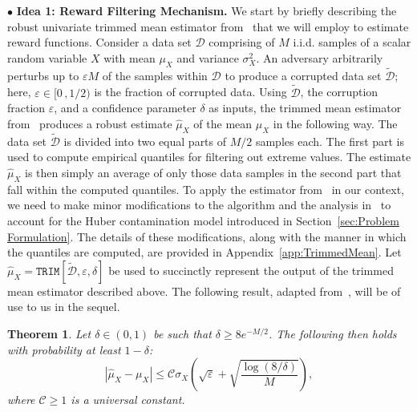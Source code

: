 \documentclass{article}
\newcommand{\mc}{\mathcal}
\newtheorem{theorem}{Theorem}
\begin{document}
$\bullet$ \textbf{Idea 1: Reward Filtering Mechanism.} We start by briefly describing the robust univariate trimmed mean estimator from~\citet{lugosi} that we will employ to estimate reward functions. Consider a data set $\mc{D}$ comprising of $M$ i.i.d. samples of a scalar random variable $X$ with mean $\mu_X$ and variance $\sigma^2_X$. An adversary arbitrarily perturbs up to $\varepsilon M$ of the samples within $\mc{D}$ to produce a corrupted data set $\tilde{\mc{D}}$; here, $\varepsilon \in [0 \, ,1/2)$ is the fraction of corrupted data. Using $\tilde{\mc{D}}$, the corruption fraction $\varepsilon$, and a confidence parameter $\delta$ as inputs, the trimmed mean estimator from~\citet{lugosi} produces a robust estimate $\hat{\mu}_X$ of the mean $\mu_X$ in the following way. The data set $\tilde{\mc{D}}$ is divided into two equal parts of $M/2$ samples each. The first part is used to compute empirical quantiles for filtering out extreme values. The estimate $\hat{\mu}_X$ is then simply an average of only those data samples in the second part that fall within the computed quantiles. To apply the estimator from~\citet{lugosi} in our context, we need to make minor modifications to the algorithm and the analysis in~\citet{lugosi} to account for the Huber contamination model introduced in Section~\ref{sec:Problem Formulation}. The details of these modifications, along with the manner in which the quantiles are computed, are provided in Appendix~\ref{app:TrimmedMean}. Let $\hat{\mu}_X = \texttt{TRIM}[\tilde{\mc{D}}, \varepsilon, \delta]$ be used to succinctly represent the output of the trimmed mean estimator described above. The following result, adapted from~\citet{lugosi}, will be of use to us in the sequel. 
\begin{theorem}
\label{thm:lugosi} 
Let $\delta \in (0,1)$ be such that $\delta \geq 8 e^{-M/2}$. The following then holds with probability at least $1 - \delta$: 
\begin{equation}
\left| \widehat{\mu}_X - \mu_X \right| \leq \mathcal{C} \sigma_X \left( \sqrt{\varepsilon} + \sqrt{ \frac{\log(8/\delta)}{M} } \right),
\label{eqn:lugosi_bnd}
\end{equation}
where $\mc{C} \geq 1$ is a universal constant.
\end{theorem}
\end{document}
